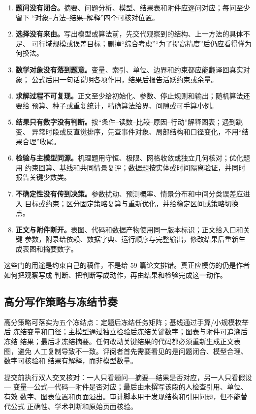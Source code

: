 \documentclass[UTF8,a4paper,12pt]{ctexart}
\begin{document}
\begin{enumerate}
  \item \textbf{题问没有闭合。}摘要、问题分析、模型、结果表和附件应逐问对应；每问至少留下
  “对象--方法--结果--解释”四个可核对位置。
  \item \textbf{选择没有来由。}写出模型或算法前，先交代观察到的结构、上一方法的具体不足、
  可行域规模或误差目标；删掉“综合考虑”“为了提高精度”后仍应看得懂为何换法。
  \item \textbf{数学对象没有落到题意。}变量、索引、单位、边界和约束都应能翻译回真实对象；
  公式后用一句话说明各项作用，结果后报告活跃约束或余量。
  \item \textbf{求解过程不可复现。}正文至少给初始化、参数、停止规则和输出；随机算法还要给
  预算、种子或重复统计，精确算法给界、间隙或可手算小例。
  \item \textbf{结果只有数字没有判断。}按“条件--读数--比较--原因--行动”解释图表；遇到跳变、
  异常时段或反直觉排序，先查事件对象、局部结构和口径变化，不用“结果合理”收尾。
  \item \textbf{检验与主模型同源。}机理题用守恒、极限、网格收敛或独立几何核对；优化题用
  约束回算、基线和共同情景复评；数据题按实体或时间隔离验证，并同时报告关键少数类。
  \item \textbf{不确定性没有传到决策。}参数扰动、预测概率、情景分布和中间分类误差应进入
  目标或约束；区分固定策略复算与重新优化，并给稳定区间或策略切换点。
  \item \textbf{正文与附件断开。}表图、代码和数据产物使用同一版本标识；正文给入口和关键
  参数，附录给依赖、数据字典、运行顺序与完整输出，修改结果后重新生成表图和摘要数字。
\end{enumerate}

这些门的用途是约束自己的稿件，不是给 59 篇论文排错。真正应模仿的仍是作者如何把观察写成
判断、把判断写成动作，再由结果和检验完成这一动作。
\subsection{高分写作策略与冻结节奏}

高分策略可落实为五个冻结点：定题后冻结任务矩阵；基线通过手算/小规模枚举后
冻结变量和口径；主模型通过独立检验后冻结关键数字；图表与附件可追溯后冻结
结果；最后才冻结摘要。任何改动关键结果的代码都必须重新生成正文表图，避免
人工复制导致不一致。评阅者首先需要看见的是问题闭合、模型合理、数字可核验和
结果有解释，而非模型数量。

提交前执行双人交叉核对：一人只看题问—摘要—结果是否对应，另一人只看假设—
变量—公式—代码—附件是否对应；最后由未撰写该段的人检查引用、单位、有效
数字、图表位置和页面溢出。审计脚本用于发现结构和引用问题，但不能替代公式
正确性、学术判断和原始页面核验。
\end{document}
